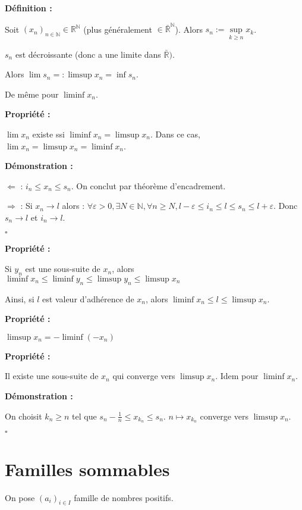 \documentclass[10pt,a4paper,notitlepage ]{report}
\newenvironment{definition}{
	
	\textbf{Définition : }
}
{}
\newcounter{th}
\newenvironment{propriete}[1][]{
	\begin{tcolorbox}
		\textbf{Propriété #1 : }
}
{\end{tcolorbox}}
\newenvironment{demo}[1][]{

	\textbf{Démonstration #1 :}
}{\begin{flushright}
	$\square$
\end{flushright}
}
\begin{document}
\begin{definition}
	
Soit $(x_n)_{n\in\mathbb N} \in \mathbb R ^\mathbb N$ (plus généralement $\in\bar{\mathbb R}^\mathbb N$). Alors $s_n := \underset{k\geq n}{\sup} x_k$.

$s_n$ est décroissante (donc a une limite dans $\bar{\mathbb R})$.

Alors $\lim s_n =: \limsup x_n = \inf s_n$.

De même pour $\liminf x_n$. 
\end{definition}
\begin{propriete}
	$\lim x_n$ existe ssi $\liminf x_n = \limsup x_n$. Dans ce cas, $\lim x_n = \limsup x_n = \liminf x_n$.
\end{propriete}

\begin{demo}
	$\Leftarrow$ : $i_n \leq x_n \leq s_n$. On conclut par théorème d'encadrement.
	
	$\Rightarrow$ : Si $x_n \rightarrow l$ alors : $\forall \varepsilon > 0, \exists N \in \mathbb N, \forall n \geq N, l-\varepsilon \leq i_n \leq l \leq s_n \leq l+\varepsilon$.
	Donc $s_n \rightarrow l$ et $i_n \rightarrow l$.
\end{demo}

\begin{propriete}
	Si $y_n$ est une sous-suite de $x_n$, alors $\liminf x_n \le \liminf y_n \le \limsup y_n \le \limsup x_n$
\end{propriete}

Ainsi, si $l$ est valeur d'adhérence de $x_n$, alors $\liminf x_n \le l \le \limsup x_n$.
\begin{propriete}
	$\limsup x_n = -\liminf (-x_n)$
\end{propriete}

\begin{propriete}
	Il existe une sous-suite de $x_n$ qui converge vers $\limsup x_n$. Idem pour $\liminf x_n$.
\end{propriete}
\begin{demo}
	On choisit $k_n \ge n$ tel que $s_n - \frac{1}{n} \le x_{k_n} \le s_n$. $n \mapsto x_{k_n}$ converge vers $\limsup x_n$.
\end{demo}

\section{Familles sommables}

On pose $(a_i)_{i\in I}$ famille de nombres positifs.
\end{document}
